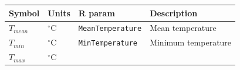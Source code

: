 \documentclass[]{book}
\begin{document}
\begin{longtable}[]{@{}llll@{}}
\toprule
\begin{minipage}[b]{0.11\columnwidth}\raggedright\strut
Symbol\strut
\end{minipage} & \begin{minipage}[b]{0.10\columnwidth}\raggedright\strut
Units\strut
\end{minipage} & \begin{minipage}[b]{0.12\columnwidth}\raggedright\strut
R param\strut
\end{minipage} & \begin{minipage}[b]{0.45\columnwidth}\raggedright\strut
Description\strut
\end{minipage}\tabularnewline
\midrule
\endhead
\begin{minipage}[t]{0.11\columnwidth}\raggedright\strut
\(T_{mean}\)\strut
\end{minipage} & \begin{minipage}[t]{0.10\columnwidth}\raggedright\strut
\(^{\circ} \mathrm{C}\)\strut
\end{minipage} & \begin{minipage}[t]{0.12\columnwidth}\raggedright\strut
\texttt{MeanTemperature}\strut
\end{minipage} & \begin{minipage}[t]{0.45\columnwidth}\raggedright\strut
Mean temperature\strut
\end{minipage}\tabularnewline
\begin{minipage}[t]{0.11\columnwidth}\raggedright\strut
\(T_{min}\)\strut
\end{minipage} & \begin{minipage}[t]{0.10\columnwidth}\raggedright\strut
\(^{\circ} \mathrm{C}\)\strut
\end{minipage} & \begin{minipage}[t]{0.12\columnwidth}\raggedright\strut
\texttt{MinTemperature}\strut
\end{minipage} & \begin{minipage}[t]{0.45\columnwidth}\raggedright\strut
Minimum temperature\strut
\end{minipage}\tabularnewline
\begin{minipage}[t]{0.11\columnwidth}\raggedright\strut
\(T_{max}\)\strut
\end{minipage} & \begin{minipage}[t]{0.10\columnwidth}\raggedright\strut
\(^{\circ} \mathrm{C}\)\strut
\end{minipage} & \begin{minipage}[t]{0.12\columnwidth}\raggedright\strut

\end{minipage}
\end{longtable}
\end{document}
